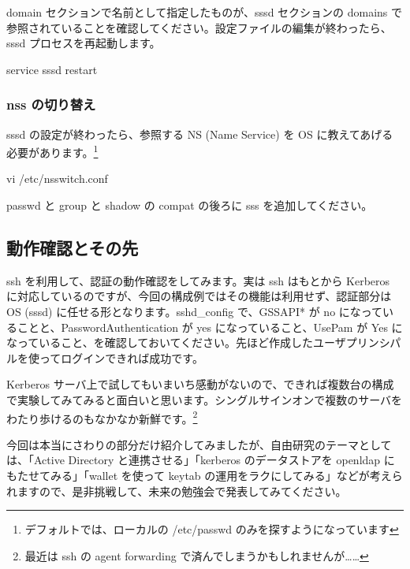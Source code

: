 \documentclass[mingoth,a4paper]{jsarticle}
\begin{document}
domain セクションで名前として指定したものが、sssd セクションの domains で参照されていることを確認してください。設定ファイルの編集が終わったら、sssd プロセスを再起動します。

\begin{commandline}
service sssd restart
\end{commandline}

\subsubsection{nss の切り替え}

sssd の設定が終わったら、参照する NS (Name Service) を OS に教えてあげる必要があります。\footnote{デフォルトでは、ローカルの /etc/passwd のみを探すようになっています}

\begin{commandline}
vi /etc/nsswitch.conf
\end{commandline}

passwd と group と shadow の compat の後ろに sss を追加してください。

\subsection{動作確認とその先}

ssh を利用して、認証の動作確認をしてみます。実は ssh はもとから Kerberos に対応しているのですが、今回の構成例ではその機能は利用せず、認証部分は OS (sssd) に任せる形となります。sshd\_config で、GSSAPI* が no になっていることと、PasswordAuthentication が yes になっていること、UsePam が Yes になっていること、を確認しておいてください。先ほど作成したユーザプリンシパルを使ってログインできれば成功です。

Kerberos サーバ上で試してもいまいち感動がないので、できれば複数台の構成で実験してみてみると面白いと思います。シングルサインオンで複数のサーバをわたり歩けるのもなかなか新鮮です。\footnote{最近は ssh の agent forwarding で済んでしまうかもしれませんが……}

今回は本当にさわりの部分だけ紹介してみましたが、自由研究のテーマとしては、「Active Directory と連携させる」「kerberos のデータストアを openldap にもたせてみる」「wallet を使って keytab の運用をラクにしてみる」などが考えられますので、是非挑戦して、未来の勉強会で発表してみてください。

\end{document}
